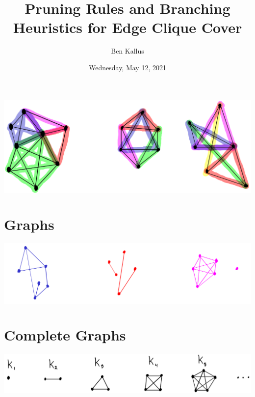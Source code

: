 \documentclass[12pt]{article}
\title{Pruning Rules and Branching Heuristics for Edge Clique Cover}
\author{Ben Kallus}
\date{Wednesday, May 12, 2021}
\begin{document}
\maketitle

\begin{center} \includegraphics{fig1.png} \end{center}

\newpage
\section*{Graphs}
    \begin{center} \includegraphics{fig0.png} \end{center}

\newpage
\section*{Complete Graphs}
    \begin{center} \includegraphics{fig5.png} \end{center}
\end{document}
